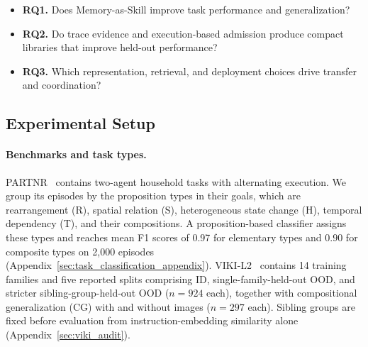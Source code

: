 \documentclass{article}
\theoremstyle{plain}
\theoremstyle{definition}
\theoremstyle{remark}
\begin{document}
\begin{itemize}[leftmargin=1.5em, itemsep=0.2em, topsep=0.2em, parsep=0pt]
    \item \textbf{RQ1.} Does Memory-as-Skill improve task performance and generalization?
    \item \textbf{RQ2.} Do trace evidence and execution-based admission produce compact libraries that improve held-out performance?
    \item \textbf{RQ3.} Which representation, retrieval, and deployment choices drive transfer and coordination?
\end{itemize}

 
 
 
 
\subsection{Experimental Setup}
\label{subsec:setup}
 
\paragraph{Benchmarks and task types.}
PARTNR~\citep{PARTNR} contains two-agent household tasks with alternating execution. We group its episodes by the proposition types in their goals, which are rearrangement (R), spatial relation (S), heterogeneous state change (H), temporal dependency (T), and their compositions. A proposition-based classifier assigns these types and reaches mean F1 scores of 0.97 for elementary types and 0.90 for composite types on 2{,}000 episodes (Appendix~\ref{sec:task_classification_appendix}). VIKI-L2~\citep{kang2025viki} contains 14 training families and five reported splits comprising ID, single-family-held-out OOD, and stricter sibling-group-held-out OOD ($n=924$ each), together with compositional generalization (CG) with and without images ($n=297$ each). Sibling groups are fixed before evaluation from instruction-embedding similarity alone (Appendix~\ref{sec:viki_audit}).
\end{document}
